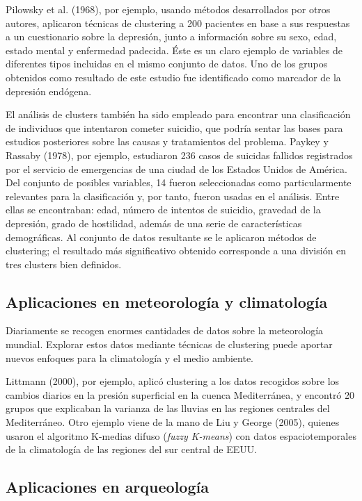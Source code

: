 Pilowsky et al. (1968), por ejemplo, usando métodos desarrollados por otros autores, aplicaron técnicas de clustering a 200 pacientes en base a sus respuestas a un cuestionario sobre la depresión, junto a información sobre su sexo, edad, estado mental y enfermedad padecida. Éste es un claro ejemplo de variables de diferentes tipos incluidas en el mismo conjunto de datos. Uno de los grupos obtenidos como resultado de este estudio fue identificado como marcador de la depresión endógena.

El análisis de clusters también ha sido empleado para encontrar una clasificación de individuos que intentaron cometer suicidio, que podría sentar las bases para estudios posteriores sobre las causas y tratamientos del problema. Paykey y Rassaby (1978), por ejemplo, estudiaron 236 casos de suicidas fallidos registrados por el servicio de emergencias de una ciudad de los Estados Unidos de América. Del conjunto de posibles variables, 14 fueron seleccionadas como particularmente relevantes para la clasificación y, por tanto, fueron usadas en el análisis. Entre ellas se encontraban: edad, número de intentos de suicidio, gravedad de la depresión, grado de hostilidad, además de una serie de características demográficas. Al conjunto de datos resultante se le aplicaron métodos de clustering; el resultado más significativo obtenido corresponde a una división en tres clusters bien definidos.

\subsection{Aplicaciones en meteorología y climatología}

Diariamente se recogen enormes cantidades de datos sobre la meteorología mundial. Explorar estos datos mediante técnicas de clustering puede aportar nuevos enfoques para la climatología y el medio ambiente.

Littmann (2000), por ejemplo, aplicó clustering a los datos recogidos sobre los cambios diarios en la presión superficial en la cuenca Mediterránea, y encontró 20 grupos que explicaban la varianza de las lluvias en las regiones centrales del Mediterráneo. Otro ejemplo viene de la mano de Liu y George (2005), quienes usaron el algoritmo K-medias difuso (\textit{fuzzy K-means}) con datos espaciotemporales de la climatología de las regiones del sur central de EEUU. 

\subsection{Aplicaciones en arqueología}

